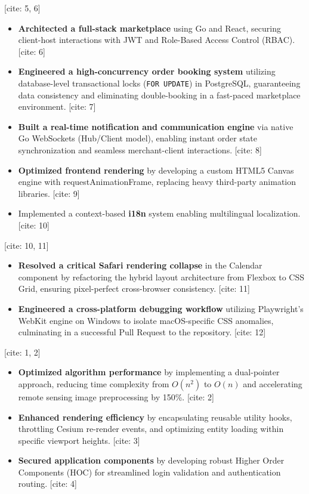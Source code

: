 \documentclass{resume}
\begin{document}
 [cite: 5, 6]
\begin{itemize}
  \item \textbf{Architected a full-stack marketplace} using Go and React, securing client-host interactions with JWT and Role-Based Access Control (RBAC). [cite: 6]
  \item \textbf{Engineered a high-concurrency order booking system} utilizing database-level transactional locks (\texttt{FOR UPDATE}) in PostgreSQL, guaranteeing data consistency and eliminating double-booking in a fast-paced marketplace environment. [cite: 7]
  \item \textbf{Built a real-time notification and communication engine} via native Go WebSockets (Hub/Client model), enabling instant order state synchronization and seamless merchant-client interactions. [cite: 8]
  \item \textbf{Optimized frontend rendering} by developing a custom HTML5 Canvas engine with requestAnimationFrame, replacing heavy third-party animation libraries. [cite: 9]
  \item Implemented a context-based \textbf{i18n} system enabling multilingual localization. [cite: 10]
\end{itemize}

 [cite: 10, 11]
\begin{itemize}
  \item \textbf{Resolved a critical Safari rendering collapse} in the Calendar component by refactoring the hybrid layout architecture from Flexbox to CSS Grid, ensuring pixel-perfect cross-browser consistency. [cite: 11]
  \item \textbf{Engineered a cross-platform debugging workflow} utilizing Playwright's WebKit engine on Windows to isolate macOS-specific CSS anomalies, culminating in a successful Pull Request to the repository. [cite: 12]
\end{itemize}

 [cite: 1, 2]
\begin{itemize}
  \item \textbf{Optimized algorithm performance} by implementing a dual-pointer approach, reducing time complexity from $O(n^2)$ to $O(n)$ and accelerating remote sensing image preprocessing by 150\%. [cite: 2]
  \item \textbf{Enhanced rendering efficiency} by encapsulating reusable utility hooks, throttling Cesium re-render events, and optimizing entity loading within specific viewport heights. [cite: 3]
  \item \textbf{Secured application components} by developing robust Higher Order Components (HOC) for streamlined login validation and authentication routing. [cite: 4]
\end{itemize}
\end{document}
